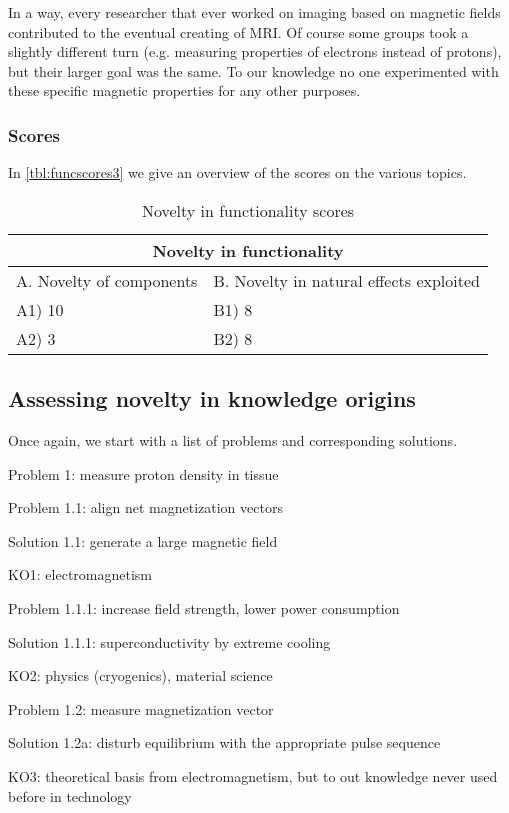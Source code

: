 In a way, every researcher that ever worked on imaging based on magnetic fields
contributed to the eventual creating of MRI. Of course some groups took a
slightly different turn (e.g. measuring properties of electrons instead of
protons), but their larger goal was the same. To our knowledge no one
experimented with these specific magnetic properties for any other purposes.

\subsubsection{Scores}
In \autoref{tbl:funcscores3} we give an overview of the scores on the various
topics.

\begin{table}[h]
\centering
\begin{tabular}{l l}
\hline
\multicolumn{2}{|c|}{Novelty in functionality} \\
\hline
A. Novelty of components & B. Novelty in natural effects exploited\\
A1) 10 & B1) 8\\ 
A2) 3 & B2) 8\\ 
\hline
\end{tabular}
\caption{Novelty in functionality scores}
\label{tbl:funcscores3}
\end{table}

\subsection{Assessing novelty in knowledge origins}
Once again, we start with a list of problems and corresponding solutions.

Problem 1: measure proton density in tissue

Problem 1.1: align net magnetization vectors

Solution 1.1: generate a large magnetic field

KO1: electromagnetism

Problem 1.1.1: increase field strength, lower power consumption

Solution 1.1.1: superconductivity by extreme cooling

KO2: physics (cryogenics), material science

Problem 1.2: measure magnetization vector

Solution 1.2a: disturb equilibrium with the appropriate pulse sequence

KO3: theoretical basis from electromagnetism, but to out knowledge never used
before in technology

